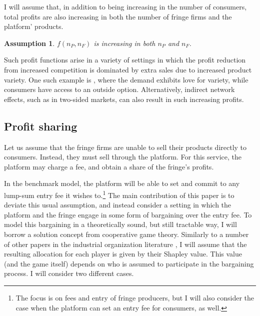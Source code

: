 \documentclass[a4paper]{article}
\newtheorem{assumption}{Assumption}
\begin{document}
I will assume that, in addition to being increasing in the number of consumers, total profits are also increasing in both the number of fringe firms and the platform' products.
\begin{assumption}
    \label{ass:monotone_profits}
    $f(n_P, n_F)$ is increasing in both $n_P$ and $n_F$.
\end{assumption}
Such profit functions arise in a variety of settings in which the profit reduction from increased competition is dominated by extra sales due to increased product variety.
One such example is \textcite{anderson2020aggregative}, where the demand exhibits love for variety, while consumers have access to an outside option.
Alternatively, indirect network effects, such as in two-sided markets, can also result in such increasing profits.


\subsection{Profit sharing}

Let us assume that the fringe firms are unable to sell their products directly to consumers.
Instead, they must sell through the platform.
For this service, the platform may charge a fee, and obtain a share of the fringe's profits.

In the benchmark model, the platform will be able to set and commit to any lump-sum entry fee it wishes to.\footnote{
    The focus is on fees and entry of fringe producers, but I will also consider the case when the platform can set an entry fee for consumers, as well.
}
The main contribution of this paper is to deviate this usual assumption, and instead consider a setting in which the platform and the fringe engage in some form of bargaining over the entry fee.
To model this bargaining in a theoretically sound, but still tractable way, I will borrow a solution concept from cooperative game theory.
Similarly to a number of other papers in the industrial organization literature \parencite[e.g.][]{montez2007downstream,hart1990property,levy1997individual,inderst2003bargaining,brugemann2019intra}, I will assume that the resulting allocation for each player is given by their Shapley value.
This value (and the game itself) depends on who is assumed to participate in the bargaining process.
I will consider two different cases.
\end{document}
